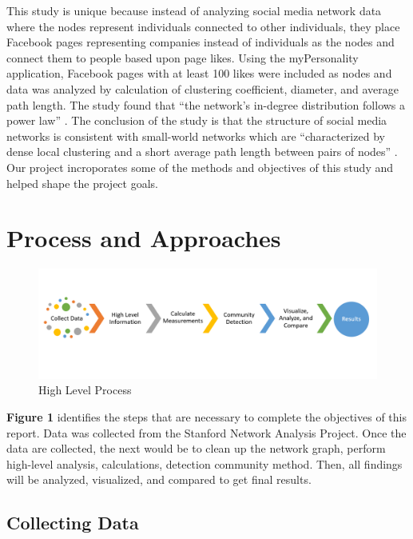 \documentclass[11pt,twocolumn]{article}
\begin{document}
This study is unique because instead of analyzing social media network data where the nodes represent individuals connected to other individuals, they place Facebook pages representing companies instead of individuals as the nodes and connect them to people based upon page likes. Using the myPersonality application, Facebook pages with at least 100 likes were included as nodes and data was analyzed by calculation of clustering coefficient, diameter, and average path length. The study found that “the network’s in-degree distribution follows a power law” \cite{page-likes-facebook}. The conclusion of the study is that the structure of social media networks is consistent with small-world networks which are “characterized by dense local clustering and a short average path length between pairs of nodes” \cite{page-likes-facebook}. Our project incroporates some of the methods and objectives of this study and helped shape the project goals.

\section{Process and Approaches}

\begin{figure}[hbt!]
\includegraphics[scale=0.2]{process_flow.PNG} 
\caption{High Level Process}
\end{figure}

\textbf{Figure 1} identifies the steps that are necessary to complete the objectives of this report. Data was collected from the Stanford Network Analysis Project. Once the data are collected, the next would be to clean up the network graph, perform high-level analysis, calculations, detection community method. Then, all findings will be analyzed, visualized, and compared to get final results.

\subsection{Collecting Data}
\end{document}
